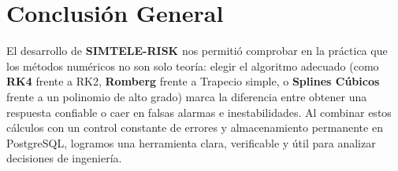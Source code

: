 \documentclass[11pt,a4paper]{article}
\begin{document}
\section{Conclusión General}
El desarrollo de \textbf{SIMTELE-RISK} nos permitió comprobar en la práctica que los métodos numéricos no son solo teoría: elegir el algoritmo adecuado (como \textbf{RK4} frente a RK2, \textbf{Romberg} frente a Trapecio simple, o \textbf{Splines Cúbicos} frente a un polinomio de alto grado) marca la diferencia entre obtener una respuesta confiable o caer en falsas alarmas e inestabilidades. Al combinar estos cálculos con un control constante de errores y almacenamiento permanente en PostgreSQL, logramos una herramienta clara, verificable y útil para analizar decisiones de ingeniería.
\end{document}
